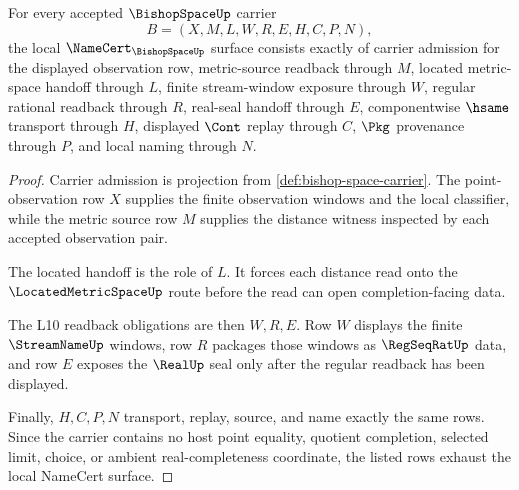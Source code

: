 \begin{theorem}
\label{thm:bishop-space-namecert-obligations}
For every accepted $\BishopSpaceUp$ carrier
$$
B=(X,M,L,W,R,E,H,C,P,N),
$$
the local $\NameCert_{\BishopSpaceUp}$ surface consists exactly of carrier admission for the displayed observation row, metric-source readback through $M$, located metric-space handoff through $L$, finite stream-window exposure through $W$, regular rational readback through $R$, real-seal handoff through $E$, componentwise $\hsame$ transport through $H$, displayed $\Cont$ replay through $C$, $\Pkg$ provenance through $P$, and local naming through $N$.
\end{theorem}
\begin{proof}
Carrier admission is projection from \autoref{def:bishop-space-carrier}. The point-observation row $X$ supplies the finite observation windows and the local classifier, while the metric source row $M$ supplies the distance witness inspected by each accepted observation pair.

The located handoff is the role of $L$. It forces each distance read onto the $\LocatedMetricSpaceUp$ route before the read can open completion-facing data.

The L10 readback obligations are then $W,R,E$. Row $W$ displays the finite $\StreamNameUp$ windows, row $R$ packages those windows as $\RegSeqRatUp$ data, and row $E$ exposes the $\RealUp$ seal only after the regular readback has been displayed.

Finally, $H,C,P,N$ transport, replay, source, and name exactly the same rows. Since the carrier contains no host point equality, quotient completion, selected limit, choice, or ambient real-completeness coordinate, the listed rows exhaust the local NameCert surface.
\end{proof}

